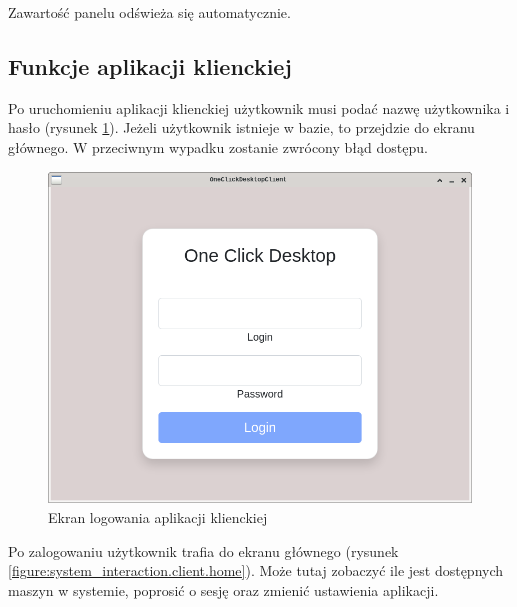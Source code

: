 \documentclass[../opis-rozwiazania.tex]{subfiles}
\begin{document}
Zawartość panelu odświeża się automatycznie.

\newpage
\subsection{Funkcje aplikacji klienckiej}

Po uruchomieniu aplikacji klienckiej użytkownik musi podać nazwę użytkownika i hasło (rysunek \ref{figure:system_interaction.client.login}).
Jeżeli użytkownik istnieje w bazie, to przejdzie do ekranu głównego.
W przeciwnym wypadku zostanie zwrócony błąd dostępu.

\begin{figure}[ht!]
  \centering
  \includegraphics[width=\textwidth]{resources/client_login.png}
  \caption{Ekran logowania aplikacji klienckiej}
  \label{figure:system_interaction.client.login}
\end{figure}

Po zalogowaniu użytkownik trafia do ekranu głównego (rysunek \ref{figure:system_interaction.client.home}).
Może tutaj zobaczyć ile jest dostępnych maszyn w systemie, poprosić o sesję oraz zmienić ustawienia aplikacji.
\end{document}
